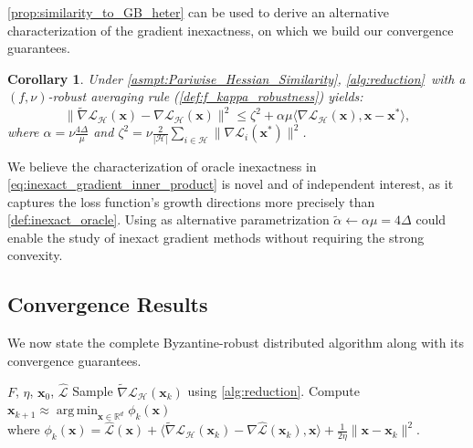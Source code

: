 \documentclass{article}
\def\vx{{\bm{x}}}
\newcommand{\R}{\mathbb{R}}
\DeclareMathOperator*{\argmin}{arg\,min}
\newcommand{\cH}{\mathcal{H}}
\newcommand{\cL}{\mathcal{L}}
\theoremstyle{plain}
\newtheorem{corollary}[theorem]{Corollary}
\theoremstyle{definition}
\theoremstyle{remark}
\begin{document}
\cref{prop:similarity_to_GB_heter} can be used to derive an alternative characterization of the gradient inexactness, on which we build our convergence guarantees.

\begin{corollary}
    Under \cref{asmpt:Pariwise_Hessian_Similarity}, \cref{alg:reduction}\ with a $(f,\nu)$-robust averaging rule (\cref{def:f_kappa_robustness}) yields:
    \begin{equation}
    \label{eq:inexact_gradient_inner_product}
    \!\!\!\|\tilde \nabla \cL_{\cH}(\vx) - \nabla \cL_{\cH}(\vx)\|^2 \le \zeta^2 + \alpha \mu \langle \nabla \cL_{\cH}(\vx), \vx - \vx^*\rangle,
    \end{equation}
    where $\alpha = \nu\frac{4\Delta}{\mu}$ and $\zeta^2 = \nu\frac{2}{|\cH|}\sum_{i \in \cH}\|\nabla \cL_i(\vx^*)\|^2$.
\end{corollary}

    We believe the characterization of oracle inexactness in  \cref{eq:inexact_gradient_inner_product} is novel and of independent interest, as it captures the loss function's growth directions more precisely than \cref{def:inexact_oracle}. Using as alternative parametrization $\tilde{\alpha} \leftarrow \alpha \mu = 4\Delta$ could enable the study of inexact gradient methods without requiring the strong convexity.

\subsection{Convergence Results}
 We now state the complete Byzantine-robust distributed algorithm along with its convergence guarantees.
 
\begin{algorithm}[h]
  \caption{Preconditioned Inexact Gradient w. Similarity}
  \label{alg:FedProxyProx}
  \begin{algorithmic}
     $F$, $\eta$, $\vx_0$, $\hat{\cL}$
     \STATE Sample $\tilde\nabla \cL_{\cH}(\vx_k)$ using \cref{alg:reduction}.
    \STATE Compute $\vx_{k+1} \approx \argmin_{\vx \in \R^d} \phi_{k}(\vx)$\\
    \STATE where $\phi_k(\vx) = \hat{\cL}(\vx) +  \langle \tilde{\nabla} \cL_{\cH}(\vx_k) - \nabla \hat{\cL}(\vx_k), \vx \rangle + \frac{1}{2\eta}\|\vx - \vx_k\|^2$.
    \ENDFOR
  \end{algorithmic}
\end{algorithm}
\end{document}
